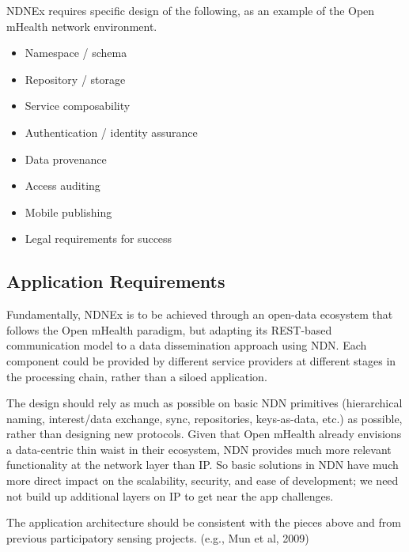NDNEx requires specific design of the following, as an example of the Open mHealth network environment.  
\begin{itemize}
\item Namespace / schema 
\item Repository / storage 
\item Service composability
\item Authentication / identity assurance
\item Data provenance
\item Access auditing
\item Mobile publishing
\item Legal requirements for success
\end{itemize}

\subsection{Application Requirements}

Fundamentally, NDNEx is to be achieved through an open-data ecosystem that follows the Open mHealth paradigm, but adapting its REST-based communication model to a data dissemination approach using NDN.  Each component could be provided by  different service providers at different stages in the processing chain, rather than a siloed application.

The design should rely as much as possible on basic NDN primitives (hierarchical naming, interest/data exchange, sync, repositories, keys-as-data, etc.) as possible, rather than designing new protocols.    Given that Open mHealth already envisions a data-centric thin waist in their ecosystem, NDN provides much more relevant functionality at the network layer than IP.   So basic solutions in NDN have much more direct impact on the scalability, security, and ease of development; we need not build up additional layers on IP to get near the app challenges.

The application architecture should be consistent with the pieces above and from previous participatory sensing projects. (e.g., Mun et al, 2009)
  
